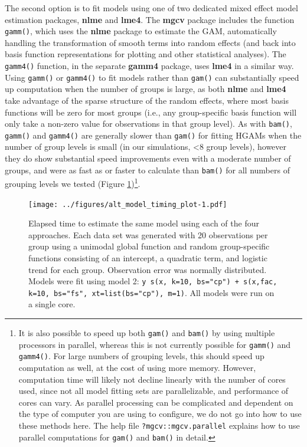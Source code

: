 \documentclass[12pt]{article}
\let\rmarkdownfootnote\footnote%
\def\footnote{\protect\rmarkdownfootnote}
\begin{document}
The second option is to fit models using one of two dedicated mixed
effect model estimation packages, \textbf{nlme} and \textbf{lme4}. The
\textbf{mgcv} package includes the function \texttt{gamm()}, which uses
the \textbf{nlme} package to estimate the GAM, automatically handling
the transformation of smooth terms into random effects (and back into
basis function representations for plotting and other statistical
analyses). The \texttt{gamm4()} function, in the separate \textbf{gamm4}
package, uses \textbf{lme4} in a similar way. Using \texttt{gamm()} or
\texttt{gamm4()} to fit models rather than \texttt{gam()} can
substantially speed up computation when the number of groups is large,
as both \textbf{nlme} and \textbf{lme4} take advantage of the sparse
structure of the random effects, where most basis functions will be zero
for most groups (i.e., any group-specific basis function will only take
a non-zero value for observations in that group level). As with
\texttt{bam()}, \texttt{gamm()} and \texttt{gamm4()} are generally
slower than \texttt{gam()} for fitting HGAMs when the number of group
levels is small (in our simulations, \textless{}8 group levels), however
they do show substantial speed improvements even with a moderate number
of groups, and were as fast as or faster to calculate than
\texttt{bam()} for all numbers of grouping levels we tested (Figure
\ref{fig:alt_timing})\footnote{It is also possible to speed up both
  \texttt{gam()} and \texttt{bam()} by using multiple processors in
  parallel, whereas this is not currently possible for \texttt{gamm()}
  and \texttt{gamm4()}. For large numbers of grouping levels, this
  should speed up computation as well, at the cost of using more memory.
  However, computation time will likely not decline linearly with the
  number of cores used, since not all model fitting sets are
  parallelizable, and performance of cores can vary. As parallel
  processing can be complicated and dependent on the type of computer
  you are using to configure, we do not go into how to use these methods
  here. The help file \texttt{?mgcv::mgcv.parallel} explains how to use
  parallel computations for \texttt{gam()} and \texttt{bam()} in detail.}.

\begin{figure}
\centering
\texttt{[image: ../figures/alt\_model\_timing\_plot-1.pdf]}
\caption{\label{fig:alt_timing}Elapsed time to estimate the same model
using each of the four approaches. Each data set was generated with 20
observations per group using a unimodal global function and random
group-specific functions consisting of an intercept, a quadratic term,
and logistic trend for each group. Observation error was normally
distributed. Models were fit using model 2:
\texttt{y~s(x, k=10, bs="cp") + s(x,fac, k=10, bs="fs", xt=list(bs="cp"), m=1)}.
All models were run on a single core.}
\end{figure}
\end{document}
